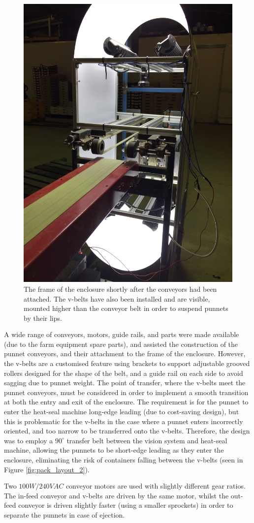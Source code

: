 \documentclass[fleqn,twoside,12pt]{report}
\begin{document}
\begin{figure}[h]
	\centering
	\includegraphics[width=.5\linewidth]{system_construct_2_2.jpg}
	\caption{The frame of the enclosure shortly after the conveyors had been attached. The v-belts have also been installed and are visible, mounted higher than the conveyor belt in order to suspend punnets by their lips.}
	\label{fig:system_construct_3}
\end{figure}%


A wide range of conveyors, motors, guide rails, and parts were made available (due to the farm equipment spare parts), and assisted the construction of the punnet conveyors, and their attachment to the frame of the enclosure. However, the v-belts are a customised feature using brackets to support adjustable grooved rollers designed for the shape of the belt, and a guide rail on each side to avoid sagging due to punnet weight. The point of transfer, where the v-belts meet the punnet conveyors, must be considered in order to implement a smooth transition at both the entry and exit of the enclosure. The requirement is for the punnet to enter the heat-seal machine long-edge leading (due to cost-saving design), but this is problematic for the v-belts in the case where a  punnet enters incorrectly oriented, and too narrow to be transferred onto the v-belts. Therefore, the design was to employ a $90^{\circ}$ transfer belt between the vision system and heat-seal machine, allowing the punnets to be short-edge leading as they enter the enclosure, eliminating the risk of containers falling between the v-belts (seen in Figure \ref{fig:pack_layout_2}). 


Two $100W/240VAC$ conveyor motors are used with slightly different gear ratios. The in-feed conveyor and v-belts are driven by the same motor, whilst the out-feed conveyor is driven slightly faster (using a smaller sprockets) in order to separate the punnets in case of ejection.
\end{document}
